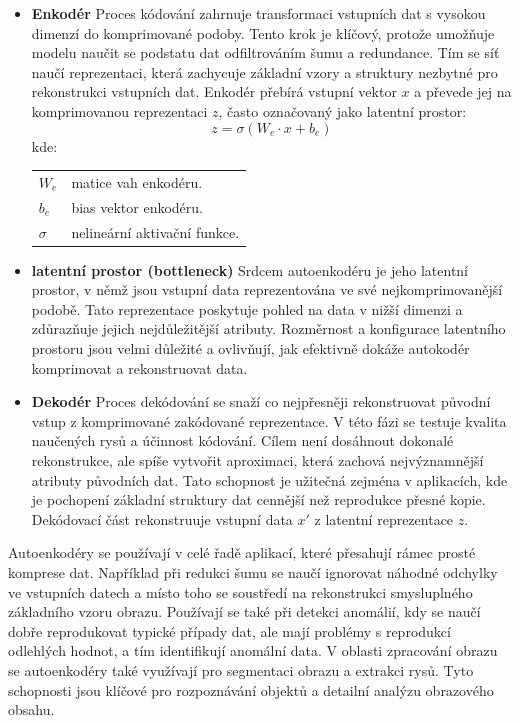 \documentclass[male,czech,api_ing]{thesis}
\makeatletter
\newenvironment{conditions}[1][kde:]
    {#1 \begin{tabular}[t]{>{$}l<{$} @{${}={}$} >{\raggedright\arraybackslash}p{10cm}}}
    {\end{tabular}}
\makeatother
\begin{document}
\begin{itemize}
    \item \textbf{Enkodér} Proces kódování zahrnuje transformaci vstupních dat s vysokou dimenzí do komprimované podoby. Tento krok je klíčový, protože umožňuje modelu naučit se podstatu dat odfiltrováním šumu a redundance. Tím se síť naučí reprezentaci, která zachycuje základní vzory a struktury nezbytné pro rekonstrukci vstupních dat. Enkodér přebírá vstupní vektor $x$ a převede jej na komprimovanou reprezentaci $z$, často označovaný jako latentní prostor:
    \begin{equation}
        z = \sigma(W_e \cdot x + b_e)
    \end{equation}
    \begin{conditions}
        W_e & matice vah enkodéru. \\
        b_e & bias vektor enkodéru. \\
        \sigma & nelineární aktivační funkce.
    \end{conditions}
    \item \textbf{latentní prostor (bottleneck)} Srdcem autoenkodéru je jeho latentní prostor, v němž jsou vstupní data reprezentována ve své nejkomprimovanější podobě. Tato reprezentace poskytuje pohled na data v nižší dimenzi a zdůrazňuje jejich nejdůležitější atributy. Rozměrnost a konfigurace latentního prostoru jsou velmi důležité a ovlivňují, jak efektivně dokáže autokodér komprimovat a rekonstruovat data.
    \item \textbf{Dekodér} Proces dekódování se snaží co nejpřesněji rekonstruovat původní vstup z komprimované zakódované reprezentace. V této fázi se testuje kvalita naučených rysů a účinnost kódování. Cílem není dosáhnout dokonalé rekonstrukce, ale spíše vytvořit aproximaci, která zachová nejvýznamnější atributy původních dat. Tato schopnost je užitečná zejména v aplikacích, kde je pochopení základní struktury dat cennější než reprodukce přesné kopie. Dekódovací část rekonstruuje vstupní data $x'$ z latentní reprezentace $z$.
\end{itemize}

Autoenkodéry se používají v celé řadě aplikací, které přesahují rámec prosté komprese dat. Například při redukci šumu se naučí ignorovat náhodné odchylky ve vstupních datech a místo toho se soustředí na rekonstrukci smysluplného základního vzoru obrazu. Používají se také při detekci anomálií, kdy se naučí dobře reprodukovat typické případy dat, ale mají problémy s reprodukcí odlehlých hodnot, a tím identifikují anomální data. V oblasti zpracování obrazu se autoenkodéry také využívají pro segmentaci obrazu a extrakci rysů. Tyto schopnosti jsou klíčové pro rozpoznávání objektů a detailní analýzu obrazového obsahu. \cite{Autoencoders, AutoencodersIntroduction}
\end{document}
